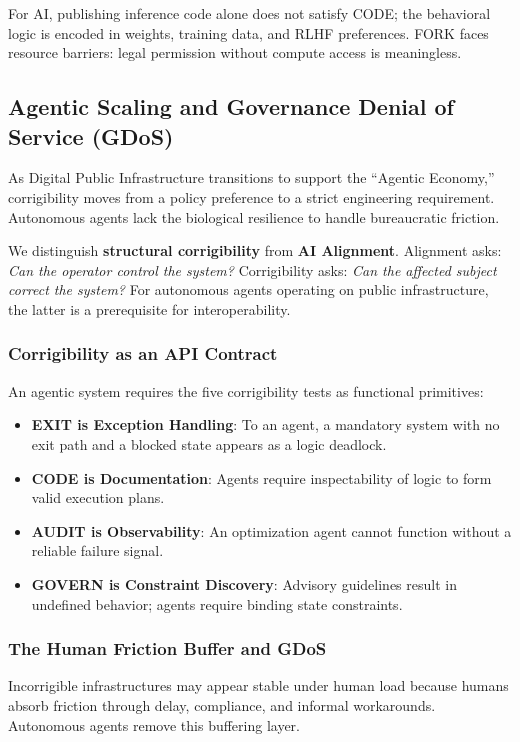 For AI, publishing inference code alone does not satisfy CODE; the behavioral logic is encoded in weights, training data, and RLHF preferences. FORK faces resource barriers: legal permission without compute access is meaningless.

\subsection{Agentic Scaling and Governance Denial of Service (GDoS)}
\label{subsec:gdos}

As Digital Public Infrastructure transitions to support the ``Agentic Economy,'' corrigibility moves from a policy preference to a strict engineering requirement. Autonomous agents lack the biological resilience to handle bureaucratic friction.

We distinguish \textbf{structural corrigibility} from \textbf{AI Alignment}. Alignment asks: \textit{Can the operator control the system?} Corrigibility asks: \textit{Can the affected subject correct the system?} For autonomous agents operating on public infrastructure, the latter is a prerequisite for interoperability.

\subsubsection{Corrigibility as an API Contract}
An agentic system requires the five corrigibility tests as functional primitives:
\begin{itemize}[noitemsep]
    \item \textbf{EXIT is Exception Handling}: To an agent, a mandatory system with no exit path and a blocked state appears as a logic deadlock.
    \item \textbf{CODE is Documentation}: Agents require inspectability of logic to form valid execution plans.
    \item \textbf{AUDIT is Observability}: An optimization agent cannot function without a reliable failure signal.
    \item \textbf{GOVERN is Constraint Discovery}: Advisory guidelines result in undefined behavior; agents require binding state constraints.
\end{itemize}

\subsubsection{The Human Friction Buffer and GDoS}
Incorrigible infrastructures may appear stable under human load because humans absorb friction through delay, compliance, and informal workarounds. Autonomous agents remove this buffering layer.

